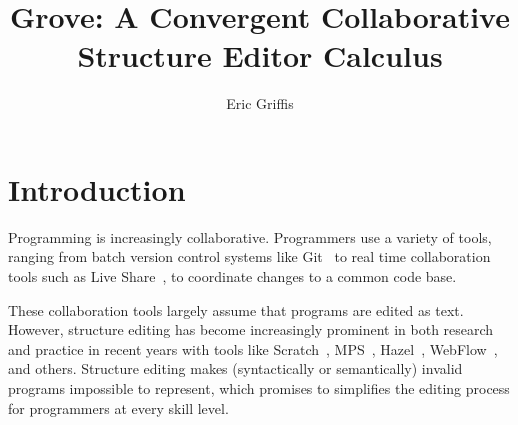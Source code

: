 \documentclass[nonacm, acmsmall, screen, review]{acmart}
\begin{document}
\title[Grove]{Grove: A Convergent Collaborative Structure Editor Calculus}


\author{Eric Griffis}


\maketitle



\section{Introduction}


Programming is increasingly collaborative.
Programmers use a variety of tools, ranging from batch version control systems like Git~\cite{chacon_pro_2014} to real time collaboration tools such as Live Share~\cite{noauthor_use_nodate}, to coordinate changes to a common code base.

These collaboration tools largely assume that programs are edited as text.
However, structure editing has become increasingly prominent in both research and practice in recent years with tools like 
Scratch~\cite{resnick_scratch_2009}, 
MPS~\cite{voelter_language_2011}, 
Hazel~\cite{omar_hazelnut_2017}, 
WebFlow~\cite{noauthor_webflow_nodate},
and others.
Structure editing makes (syntactically or semantically) invalid programs impossible to represent, which promises to simplifies the editing process for programmers at every skill level.
\end{document}

